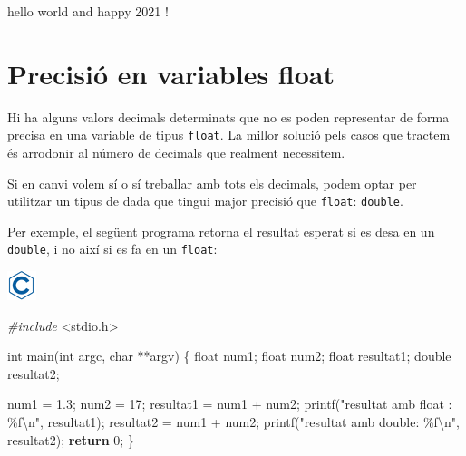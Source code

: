 \documentclass[
]{book}
\newenvironment{Shaded}{\begin{snugshade}}{\end{snugshade}}
\newcommand{\ControlFlowTok}[1]{\textcolor[rgb]{0.13,0.29,0.53}{\textbf{#1}}}
\newcommand{\DataTypeTok}[1]{\textcolor[rgb]{0.13,0.29,0.53}{#1}}
\newcommand{\DecValTok}[1]{\textcolor[rgb]{0.00,0.00,0.81}{#1}}
\newcommand{\FloatTok}[1]{\textcolor[rgb]{0.00,0.00,0.81}{#1}}
\newcommand{\ImportTok}[1]{#1}
\newcommand{\NormalTok}[1]{#1}
\newcommand{\PreprocessorTok}[1]{\textcolor[rgb]{0.56,0.35,0.01}{\textit{#1}}}
\newcommand{\SpecialCharTok}[1]{\textcolor[rgb]{0.00,0.00,0.00}{#1}}
\newcommand{\StringTok}[1]{\textcolor[rgb]{0.31,0.60,0.02}{#1}}
\begin{document}
\begin{Shaded}
\begin{Highlighting}[]
\NormalTok{hello world and happy }\DecValTok{2021}\NormalTok{ !}
\end{Highlighting}
\end{Shaded}

\hypertarget{precisiuxf3-en-variables-float}{%
\section{Precisió en variables float}\label{precisiuxf3-en-variables-float}}

Hi ha alguns valors decimals determinats que no es poden representar de forma precisa en una variable de tipus \texttt{float}. La millor solució pels casos que tractem és arrodonir al número de decimals que realment necessitem.

Si en canvi volem sí o sí treballar amb tots els decimals, podem optar per utilitzar un tipus de dada que tingui major precisió que \texttt{float}: \texttt{double}.

Per exemple, el següent programa retorna el resultat esperat si es desa en un \texttt{double}, i no així si es fa en un \texttt{float}:

\includegraphics{./img/c.png}

\begin{Shaded}
\begin{Highlighting}[]
\PreprocessorTok{\#include }\ImportTok{\textless{}stdio.h\textgreater{}}

\DataTypeTok{int}\NormalTok{ main(}\DataTypeTok{int}\NormalTok{ argc, }\DataTypeTok{char}\NormalTok{ **argv) \{ }
    \DataTypeTok{float}\NormalTok{ num1; }
    \DataTypeTok{float}\NormalTok{ num2;}
    \DataTypeTok{float}\NormalTok{ resultat1; }
    \DataTypeTok{double}\NormalTok{ resultat2; }
    
\NormalTok{    num1 = }\FloatTok{1.3}\NormalTok{; }
\NormalTok{    num2 = }\DecValTok{17}\NormalTok{;}
\NormalTok{    resultat1 = num1 + num2; }
\NormalTok{    printf(}\StringTok{"resultat amb float : \%f}\SpecialCharTok{\textbackslash{}n}\StringTok{"}\NormalTok{, resultat1); }
\NormalTok{    resultat2 = num1 + num2; }
\NormalTok{    printf(}\StringTok{"resultat amb double: \%f}\SpecialCharTok{\textbackslash{}n}\StringTok{"}\NormalTok{, resultat2); }
    \ControlFlowTok{return} \DecValTok{0}\NormalTok{; }
\NormalTok{\}}
\end{Highlighting}
\end{Shaded}
\end{document}
